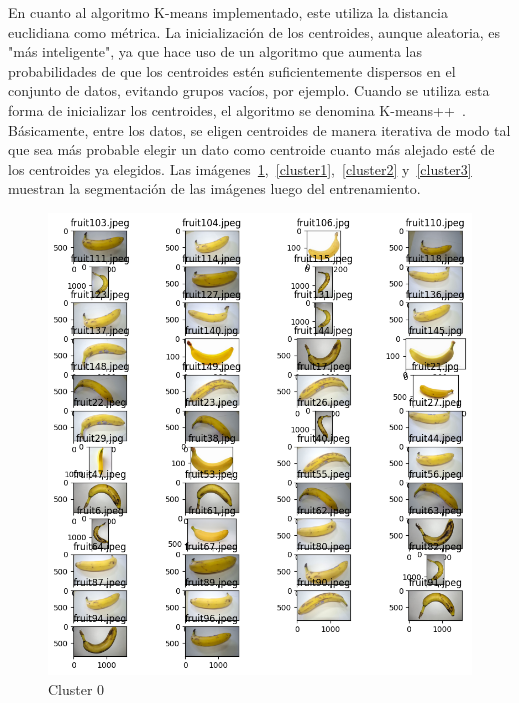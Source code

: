 \documentclass[a4paper, 12pt]{article}
\begin{document}
En cuanto al algoritmo K-means implementado, este utiliza la distancia euclidiana como métrica. La inicialización de los centroides, aunque aleatoria, es "más inteligente", ya que hace uso de un algoritmo que aumenta las probabilidades de que los centroides estén suficientemente dispersos en el conjunto de datos, evitando grupos vacíos, por ejemplo. Cuando se utiliza esta forma de inicializar los centroides, el algoritmo se denomina K-means++~\cite{WikipediaKMeansPlusPlus}. Básicamente, entre los datos, se eligen centroides de manera iterativa de modo tal que sea más probable elegir un dato como centroide cuanto más alejado esté de los centroides ya elegidos.
Las imágenes~\ref{cluster0},~\ref{cluster1},~\ref{cluster2} y~\ref{cluster3} muestran la segmentación de las imágenes luego del entrenamiento.
\begin{figure}[!htbp]
    \begin{minipage}[t]{0.5\textwidth}
        \centering
        \includegraphics[width=0.8\linewidth]{cluster0.png}
        \caption{Cluster 0}
        \label{cluster0}
    \end{minipage}%
    \begin{minipage}[t]{0.5\textwidth}
        \centering

\end{minipage}
\end{figure}
\end{document}
